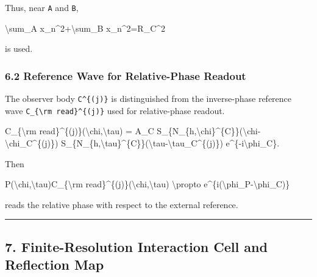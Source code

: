 \documentclass[
  a4paper,
]{article}
\newenvironment{Shaded}{}{}
\newcommand{\NormalTok}[1]{#1}
\begin{document}
Thus, near \texttt{A} and \texttt{B},

\begin{Shaded}
\begin{Highlighting}[]
\NormalTok{\textbackslash{}sum\_A x\_n\^{}2+\textbackslash{}sum\_B x\_n\^{}2=R\_C\^{}2}
\end{Highlighting}
\end{Shaded}

is used.

\subsubsection{6.2 Reference Wave for Relative-Phase
Readout}\label{reference-wave-for-relative-phase-readout}

The observer body \texttt{C\^{}\{(j)\}} is distinguished from the
inverse-phase reference wave
\texttt{C\_\{\textbackslash{}rm\ read\}\^{}\{(j)\}} used for
relative-phase readout.

\begin{Shaded}
\begin{Highlighting}[]
\NormalTok{C\_\{\textbackslash{}rm read\}\^{}\{(j)\}(\textbackslash{}chi,\textbackslash{}tau)}
\NormalTok{=}
\NormalTok{A\_C}
\NormalTok{S\_\{N\_\{h,\textbackslash{}chi\}\^{}\{C\}\}(\textbackslash{}chi{-}\textbackslash{}chi\_C\^{}\{(j)\})}
\NormalTok{S\_\{N\_\{h,\textbackslash{}tau\}\^{}\{C\}\}(\textbackslash{}tau{-}\textbackslash{}tau\_C\^{}\{(j)\})}
\NormalTok{e\^{}\{{-}i\textbackslash{}phi\_C\}.}
\end{Highlighting}
\end{Shaded}

Then

\begin{Shaded}
\begin{Highlighting}[]
\NormalTok{P(\textbackslash{}chi,\textbackslash{}tau)C\_\{\textbackslash{}rm read\}\^{}\{(j)\}(\textbackslash{}chi,\textbackslash{}tau)}
\NormalTok{\textbackslash{}propto e\^{}\{i(\textbackslash{}phi\_P{-}\textbackslash{}phi\_C)\}}
\end{Highlighting}
\end{Shaded}

reads the relative phase with respect to the external reference.

\begin{center}\rule{0.5\linewidth}{0.5pt}\end{center}

\subsection{7. Finite-Resolution Interaction Cell and Reflection
Map}\label{finite-resolution-interaction-cell-and-reflection-map}
\end{document}
